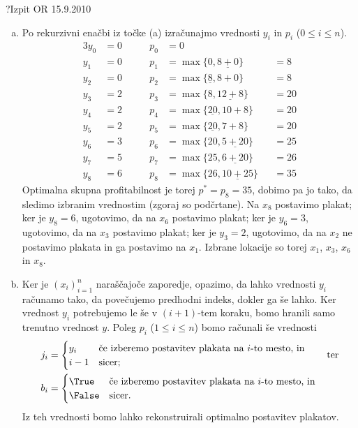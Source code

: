 \begin{naloga}{?}{Izpit OR 15.9.2010}
\begin{odgovor}
\begin{enumerate}[(a)]
\item Po rekurzivni enačbi iz točke (a)
izračunajmo vrednosti $y_i$ in $p_i$ ($0 \le i \le n$).
\begin{alignat*}{3}
y_0 &= 0 &\qquad p_0 &= 0 \\
y_1 &= 0 &\qquad p_1 &= \max\{0, \underline{8 + 0}\}    &&= 8 \\
y_2 &= 0 &\qquad p_2 &= \max\{\underline{8}, 8 + 0\}    &&= 8 \\
y_3 &= 2 &\qquad p_3 &= \max\{8, \underline{12 + 8}\}   &&= 20 \\
y_4 &= 2 &\qquad p_4 &= \max\{\underline{20}, 10 + 8\}  &&= 20 \\
y_5 &= 2 &\qquad p_5 &= \max\{\underline{20}, 7 + 8\}   &&= 20 \\
y_6 &= 3 &\qquad p_6 &= \max\{20, \underline{5 + 20}\}  &&= 25 \\
y_7 &= 5 &\qquad p_7 &= \max\{25, \underline{6 + 20}\}  &&= 26 \\
y_8 &= 6 &\qquad p_8 &= \max\{26, \underline{10 + 25}\} &&= 35
\end{alignat*}
Optimalna skupna profitabilnost je torej $p^* = p_8 = 35$,
dobimo pa jo tako, da sledimo izbranim vrednostim (zgoraj so podčrtane).
Na $x_8$ postavimo plakat;
ker je $y_8 = 6$, ugotovimo, da na $x_6$ postavimo plakat;
ker je $y_6 = 3$, ugotovimo, da na $x_3$ postavimo plakat;
ker je $y_3 = 2$, ugotovimo,
da na $x_2$ ne postavimo plakata in ga postavimo na $x_1$.
Izbrane lokacije so torej $x_1$, $x_3$, $x_6$ in $x_8$.

\item Ker je $(x_i)_{i=1}^n$ naraščajoče zaporedje,
opazimo, da lahko vrednosti $y_i$ računamo tako,
da povečujemo predhodni indeks, dokler ga še lahko.
Ker vred\-nost $y_i$ potrebujemo le še v $(i+1)$-tem koraku,
bomo hranili samo trenutno vrednost $y$.
Poleg $p_i$ ($1 \le i \le n$) bomo računali še vrednosti
\begin{align*}
j_i &= \begin{cases}
y_i & \text{če izberemo postavitev plakata na $i$-to mesto, in} \\
i-1 & \text{sicer;}
\end{cases} \qquad \text{ter} \\
b_i &= \begin{cases}
\True & \text{če izberemo postavitev plakata na $i$-to mesto, in} \\
\False & \text{sicer.}
\end{cases}
\end{align*}
Iz teh vrednosti bomo lahko rekonstruirali optimalno postavitev plakatov.


\end{enumerate}
\end{odgovor}
\end{naloga}
